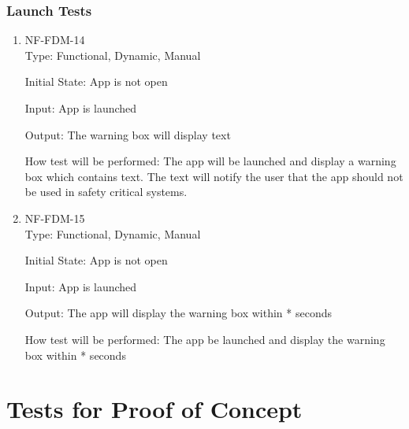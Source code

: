 \documentclass[12pt, titlepage]{article}
\begin{document}
\subsubsection{Launch Tests}
\begin{enumerate}
\item{NF-FDM-14\\}
Type: Functional, Dynamic, Manual
					
Initial State: 
App is not open
					
Input: 
App is launched
					
Output: 
The warning box will display text
					
How test will be performed: 
The app will be launched and display a warning box which contains text. The text will notify the user that the app should not be used in safety critical systems.

\item{NF-FDM-15\\}
Type: Functional, Dynamic, Manual
					
Initial State: 
App is not open
					
Input: 
App is launched
					
Output: 
The app will display the warning box within * seconds
					
How test will be performed: 
The app be launched and display the warning box within * seconds


\end{enumerate}




\section{Tests for Proof of Concept}
\end{document}
